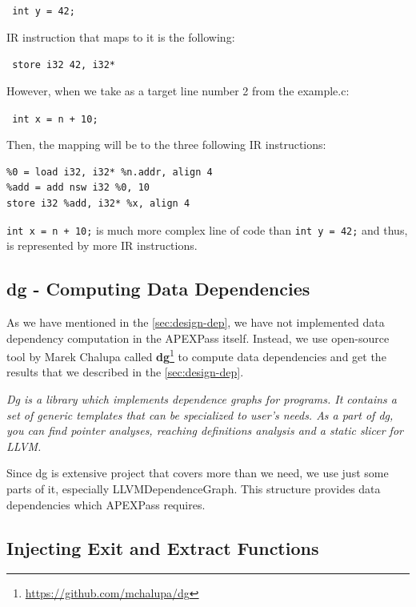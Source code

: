 \documentclass[12pt, twoside]{fithesis2}
\renewcommand{\_}{\leavevmode \kern0.07em\vbox{\hrule width0.4em}}
\begin{document}
\texttt{
int y = 42;
}

IR instruction that maps to it is the following:

\texttt{
store i32 42, i32* %
}

However, when we take as a target line number 2 from the example.c:

\texttt{
int x = n + 10;
}

Then, the mapping will be to the three following IR instructions:

\begin{verbatim}
%0 = load i32, i32* %n.addr, align 4
%add = add nsw i32 %0, 10
store i32 %add, i32* %x, align 4
\end{verbatim}

\texttt{int x = n + 10;} is much more complex line of code than
\texttt{int y = 42;} and thus, is represented by more IR instructions.


\subsection{dg - Computing Data Dependencies}

As we have mentioned in the \autoref{sec:design-dep}, we have not implemented
data dependency computation in the APEXPass itself.
Instead, we use open-source tool by Marek Chalupa called \textbf{dg}\footnote{
\url{https://github.com/mchalupa/dg}
}
to compute data dependencies and get the results that we described in the
\autoref{sec:design-dep}.

\emph{Dg is a library which implements dependence graphs for programs. It
contains a set of generic templates that can be specialized to user's needs.
As a part of dg, you can find pointer analyses, reaching definitions analysis
and a static slicer for LLVM.}\cite{dg-github}

Since dg is extensive project that covers more than we need, we use just
some parts of it, especially LLVMDependenceGraph. This structure provides
data dependencies which APEXPass requires.

\subsection{Injecting Exit and Extract Functions}
\label{sub:impl_inject}
\end{document}
